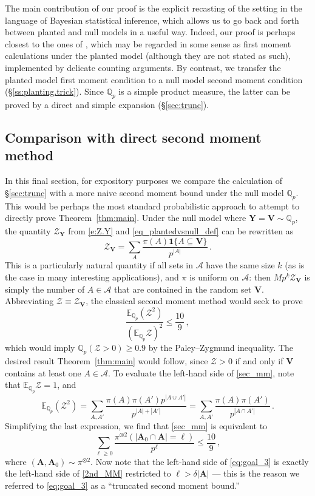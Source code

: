 \documentclass[11pt,reqno]{amsart}
\theoremstyle{plain}
\theoremstyle{definition}
\theoremstyle{remark}
\newcommand{\Q}{\mathbb{Q}}
\newcommand{\QQ}{\mathbb{Q}}
\newcommand{\EE}{\mathbb{E}}
\newcommand{\beq}{\begin{equation}}
\newcommand{\eeq}{\end{equation}}
\newcommand{\bA}{\mathbf{A}}
\newcommand{\bY}{\mathbf{Y}}
\newcommand{\bV}{\mathbf{V}}
\newcommand{\cZ}{\mathcal{Z}}
\begin{document}
The main contribution of our proof is the explicit recasting of the setting in the language of Bayesian statistical inference, which allows us to go back and forth between planted and null models in a useful way. Indeed, our proof is perhaps closest to the ones of \cite{sunflower_annals, fracKK_annals}, which may be regarded in some sense as first moment calculations under the planted model (although they are not stated as such), implemented by delicate counting arguments. By contrast, we transfer the planted model first moment condition to a null model second moment condition (\S\ref{ss:planting.trick}). Since $\Q_p$ is a simple product measure, the latter can be proved by a direct and simple expansion (\S\ref{sec:trunc}).  


\subsection{Comparison with direct second moment method}\label{sec:2ndMM}


In this final section, for expository purposes
we compare the calculation of \S\ref{sec:trunc} with a more naive second moment bound under the null model $\Q_p$. This would be perhaps the most standard probabilistic approach to attempt to directly prove Theorem~\ref{thm:main}. Under the null model where $\bY=\bV\sim\Q_p$, the quantity $\cZ_{\bY}$ from \eqref{e:Z.Y} and \eqref{eq_plantedvsnull_def} can be rewritten as
	\[
	\cZ_{\bV}
	=
	\sum_A \frac{\pi(A) \mathbf{1}\{A\subseteq \bV\}}{p^{|A|}}\,.
	\]
This is a particularly natural quantity if 
all sets in $\mathscr{A}$ have the same size $k$
(as is the case in many interesting applications),
and $\pi$ is uniform on $\mathscr{A}$: then $Mp^k\cZ_{\bV}$ is simply the number of $A\in\mathscr{A}$ that are contained in the random set $\bV$.  Abbreviating $\cZ\equiv\cZ_{\bV}$, the classical second moment method would seek to prove
	\begin{equation}\label{sec_mm}
	\frac{\EE_{\QQ_p}(\cZ^2)}{(\EE_{\QQ_p}\cZ)^2} 
	\leq \frac{10}{9}\,,
	\end{equation}
which would imply $ \Q_p(\cZ>0)  \geq 0.9$ by the Paley--Zygmund inequality. The desired result Theorem~\ref{thm:main} would follow, since $\cZ>0$ if and only if $\bV$ contains at least one $A\in\mathscr{A}$. To evaluate the left-hand side of \eqref{sec_mm}, note that $\EE_{\QQ_p}\cZ=1$, and
	\[
	\EE_{\QQ_p}(\cZ^2)
	=
	\sum_{A,A'} \frac{\pi(A)\pi(A') p^{|A\cup A'|}}{p^{|A|+|A'|}}
	=\sum_{A,A'} \frac{\pi(A)\pi(A') }{p^{|A \cap A'|}}
	\,.\]
Simplifying the last expression, we find that \eqref{sec_mm} is equivalent to
	\beq\label{2nd_MM}
	\sum_{\ell\ge0}
	\frac{\pi^{\otimes 2}\left( |\bA_0 \cap \bA|=\ell \right) }{p^{\ell}}
	\le \frac{10}{9}\,,
	\eeq
where $(\bA,\bA_0)\sim\pi^{\otimes2}$. Now note that the left-hand side of
\eqref{eq:goal_3} is exactly the left-hand side of
\eqref{2nd_MM} restricted to $\ell> \delta |\bA|$ --- this is the reason we referred to \eqref{eq:goal_3} as a ``truncated second moment bound.'' 
\end{document}
